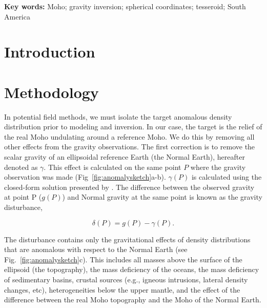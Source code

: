 \documentclass[extra,mreferee]{gji}
\title[]{\Title}
\author[]{
    Leonardo Uieda$^{1,2}$,
    Valéria C. F. Barbosa$^{2}$
    \\
    $^1$Universidade do Estado do Rio de Janeiro, Rio de Janeiro, Brazil.
    e-mail: leouieda@gmail.com
    \\
    $^2$Observatório Nacional, Rio de Janeiro, Brazil.
}
\newcommand{\Keywords}{
        Moho;
        gravity inversion;
        spherical coordinates;
        tesseroid;
        South America
}
\begin{document}
\maketitle


\begin{abstract}
\end{abstract}

\noindent\textbf{Key words:} \Keywords


\section{Introduction}


\section{Methodology}


In potential field methods,
we must isolate the target anomalous density distribution prior to modeling and
inversion.
In our case, the target is the relief of the real Moho undulating around a
reference Moho.
We do this by removing all other effects from the gravity observations.
The first correction is to remove the
scalar gravity of an ellipsoidal reference Earth (the Normal Earth),
hereafter denoted as $\gamma$.
This effect is calculated on the same point $P$ where
the gravity observation was made
(Fig~\ref{fig:anomalysketch}a-b).
$\gamma(P)$ is calculated using
the closed-form solution presented by \citet{li2001}.
The difference between the observed gravity at point P ($g(P)$)
and Normal gravity at the same point
is known as the gravity disturbance,

\begin{equation}
    \delta(P) = g(P) - \gamma(P).
    \label{eq:disturbance}
\end{equation}

The disturbance contains only the gravitational effects of density
distributions that are anomalous with respect to the Normal Earth
(see Fig.~\ref{fig:anomalysketch}c).
This includes all masses above the surface of the ellipsoid (the topography),
the mass deficiency of the oceans,
the mass deficiency of sedimentary basins,
crustal sources (e.g., igneous intrusions, lateral density changes, etc),
heterogeneities below the upper mantle,
and the effect of the difference between the real Moho
topography and the Moho of the Normal Earth.
\end{document}

